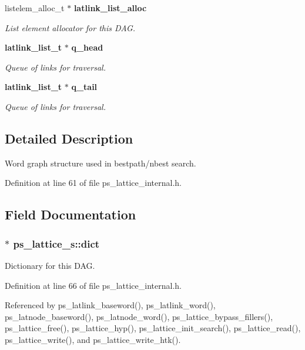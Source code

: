 \begin{DoxyCompactItemize}
listelem\-\_\-alloc\-\_\-t $\ast$ {\bf latlink\-\_\-list\-\_\-alloc}
\begin{DoxyCompactList}\small\item\em List element allocator for this D\-A\-G. \end{DoxyCompactList}\item 
{\bf latlink\-\_\-list\-\_\-t} $\ast$ {\bf q\-\_\-head}
\begin{DoxyCompactList}\small\item\em Queue of links for traversal. \end{DoxyCompactList}\item 
{\bf latlink\-\_\-list\-\_\-t} $\ast$ {\bf q\-\_\-tail}
\begin{DoxyCompactList}\small\item\em Queue of links for traversal. \end{DoxyCompactList}\end{DoxyCompactItemize}


\subsection{Detailed Description}
Word graph structure used in bestpath/nbest search. 

Definition at line 61 of file ps\-\_\-lattice\-\_\-internal.\-h.



\subsection{Field Documentation}
\subsubsection[{dict}]{$\ast$ ps\-\_\-lattice\-\_\-s\-::dict}\label{structps__lattice__s_a71865c59fae65743ef3c6b5aceb17da6}


Dictionary for this D\-A\-G. 



Definition at line 66 of file ps\-\_\-lattice\-\_\-internal.\-h.



Referenced by ps\-\_\-latlink\-\_\-baseword(), ps\-\_\-latlink\-\_\-word(), ps\-\_\-latnode\-\_\-baseword(), ps\-\_\-latnode\-\_\-word(), ps\-\_\-lattice\-\_\-bypass\-\_\-fillers(), ps\-\_\-lattice\-\_\-free(), ps\-\_\-lattice\-\_\-hyp(), ps\-\_\-lattice\-\_\-init\-\_\-search(), ps\-\_\-lattice\-\_\-read(), ps\-\_\-lattice\-\_\-write(), and ps\-\_\-lattice\-\_\-write\-\_\-htk().

